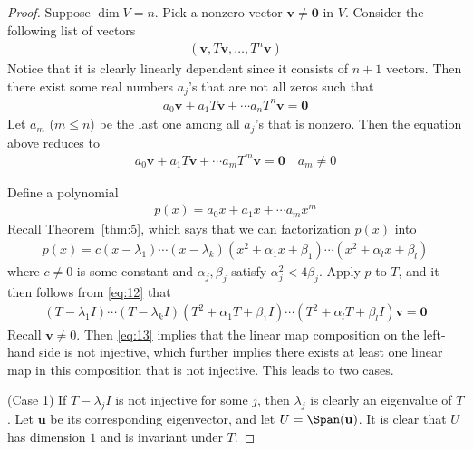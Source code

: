 \documentclass[thmcnt=section, color=blue, 12pt]{my-elegantbook}
\begin{document}
\begin{proof}
    Suppose $\dim V = n$. Pick a nonzero vector $\mathbf{v} \neq \mathbf{0}$ in $V$. Consider the following list of vectors 
    \begin{align*}
        (\mathbf{v}, T \mathbf{v}, \ldots, T^n \mathbf{v})
    \end{align*}
    Notice that it is clearly linearly dependent since it consists of $n+1$ vectors. Then there exist some real numbers $a_j$'s that are not all zeros such that 
    \begin{align*}
        a_0 \mathbf{v} + a_1 T \mathbf{v} + \cdots a_n T^n \mathbf{v} = \mathbf{0}
    \end{align*}
    Let $a_m$ ($m \leq n$) be the last one among all $a_j$'s that is nonzero. Then the equation above reduces to 
    \begin{align}
        a_0 \mathbf{v} + a_1 T \mathbf{v} + \cdots a_m T^m \mathbf{v} = \mathbf{0}
        \quad a_m \neq 0
        \label{eq:12}
    \end{align}
    
    \par Define a polynomial 
    \begin{align*}
        p(x) = a_0 x + a_1 x + \cdots a_m x^m
    \end{align*}
    Recall Theorem~\ref{thm:5}, which says that we can factorization $p(x)$ into 
    \begin{align*}
        p(x) = c (x - \lambda_1) \cdots (x - \lambda_k) 
        (x^2 + \alpha_1 x + \beta_1) \cdots 
        (x^2 + \alpha_l x + \beta_l)
    \end{align*}
    where $c \neq 0$ is some constant and $\alpha_j, \beta_j$ satisfy $\alpha_j^2 < 4\beta_j$. Apply $p$ to $T$, and it then follows from \eqref{eq:12} that 
    \begin{align}
        (T - \lambda_1 I) \cdots (T - \lambda_k I) 
        (T^2 + \alpha_1 T + \beta_1 I) \cdots 
        (T^2 + \alpha_l T + \beta_l I) \mathbf{v}
        = \mathbf{0}
        \label{eq:13}
    \end{align}
    Recall $\mathbf{v} \neq 0$. Then \eqref{eq:13} implies that the linear map composition on the left-hand side is not injective, which further implies there exists at least one linear map in this composition that is not injective. This leads to two cases.

    \par (Case 1) If $T - \lambda_j I$ is not injective for some $j$, then $\lambda_j$ is clearly an eigenvalue of $T$. Let $\mathbf{u}$ be its corresponding eigenvector, and let $U = \Span(\mathbf{u})$. It is clear that $U$ has dimension $1$ and is invariant under $T$.


\end{proof}
\end{document}
